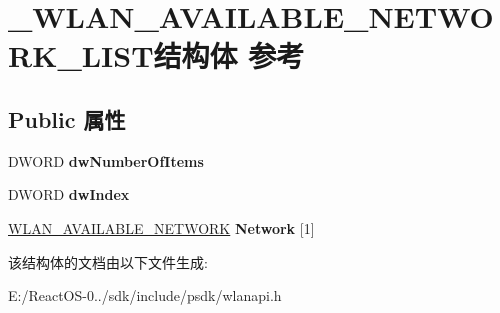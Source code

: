 \hypertarget{struct___w_l_a_n___a_v_a_i_l_a_b_l_e___n_e_t_w_o_r_k___l_i_s_t}{}\section{\+\_\+\+W\+L\+A\+N\+\_\+\+A\+V\+A\+I\+L\+A\+B\+L\+E\+\_\+\+N\+E\+T\+W\+O\+R\+K\+\_\+\+L\+I\+S\+T结构体 参考}
\label{struct___w_l_a_n___a_v_a_i_l_a_b_l_e___n_e_t_w_o_r_k___l_i_s_t}
\subsection*{Public 属性}
\begin{DoxyCompactItemize}
\item 
\mbox{\label{struct___w_l_a_n___a_v_a_i_l_a_b_l_e___n_e_t_w_o_r_k___l_i_s_t_ae3912137850ebcf3b9a68d2376ce263a}} 
D\+W\+O\+RD {\bfseries dw\+Number\+Of\+Items}
\item 
\mbox{\label{struct___w_l_a_n___a_v_a_i_l_a_b_l_e___n_e_t_w_o_r_k___l_i_s_t_a0fce9716497b43ff273e7712958d7dae}} 
D\+W\+O\+RD {\bfseries dw\+Index}
\item 
\mbox{\label{struct___w_l_a_n___a_v_a_i_l_a_b_l_e___n_e_t_w_o_r_k___l_i_s_t_a861f3ee1644e09316896d23f08f84d99}} 
\hyperlink{struct___w_l_a_n___a_v_a_i_l_a_b_l_e___n_e_t_w_o_r_k}{W\+L\+A\+N\+\_\+\+A\+V\+A\+I\+L\+A\+B\+L\+E\+\_\+\+N\+E\+T\+W\+O\+RK} {\bfseries Network} \mbox{[}1\mbox{]}
\end{DoxyCompactItemize}


该结构体的文档由以下文件生成\+:\begin{DoxyCompactItemize}
\item 
E\+:/\+React\+O\+S-\/0../sdk/include/psdk/wlanapi.\+h\end{DoxyCompactItemize}
